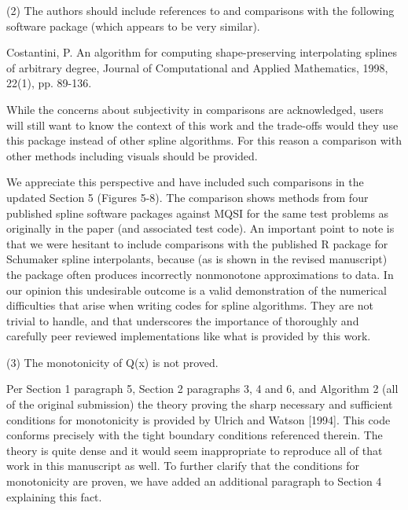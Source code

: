 \goodbreak
{\parindent=20pt \it

\item{(2)} The authors should include references to and comparisons
  with the following software package (which appears to be very
  similar).

\itemitem{} Costantini, P. An algorithm for computing shape-preserving
  interpolating splines of arbitrary degree, Journal of Computational
  and Applied Mathematics, 1998, 22(1), pp. 89-136.

\item{} While the concerns about subjectivity in comparisons are
  acknowledged, users will still want to know the context of this work
  and the trade-offs would they use this package instead of other
  spline algorithms. For this reason a comparison with other methods
  including visuals should be provided.

}

We appreciate this perspective and have included such comparisons in
the updated Section 5 (Figures 5-8). The comparison shows methods from
four published spline software packages against MQSI for the same test
problems as originally in the paper (and associated test code). An
important point to note is that we were hesitant to include
comparisons with the published R package for Schumaker spline
interpolants, because (as is shown in the revised manuscript) the
package often produces incorrectly nonmonotone approximations to
data. In our opinion this undesirable outcome is a valid demonstration
of the numerical difficulties that arise when writing codes for spline
algorithms. They are not trivial to handle, and that underscores the
importance of thoroughly and carefully peer reviewed implementations
like what is provided by this work.


\goodbreak
{\parindent=20pt \it

\item{(3)} The monotonicity of Q(x) is not proved.

}

Per Section 1 paragraph 5, Section 2 paragraphs 3, 4 and 6, and
Algorithm 2 (all of the original submission) the theory proving the
sharp necessary and sufficient conditions for monotonicity is provided
by Ulrich and Watson [1994]. This code conforms precisely with the
tight boundary conditions referenced therein. The theory is quite
dense and it would seem inappropriate to reproduce all of that work in
this manuscript as well. To further clarify that the conditions for
monotonicity are proven, we have added an additional paragraph to
Section 4 explaining this fact.



